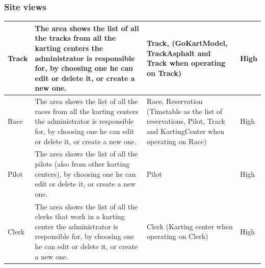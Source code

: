 \documentclass{beamer}
\begin{document}
\begin{frame}
    \frametitle{Site views}
    \begin{table}
        \centering
        \tiny
        \setlength{\tabcolsep}{1pt}
        \begin{tabular}{|m{2cm}|m{4cm}|m{3cm}|m{1cm}|}
        \hline
        Track & The area shows the list of all the tracks from all the karting centers
        the administrator is responsible for, by choosing one he can edit or delete it, or create a new one.
         & Track, (GoKartModel, TrackAsphalt and
        Track when operating on Track) & High \\
        \hline
        Race & The area shows the list of all the races 
        from all the karting centers the administrator is responsible for, by choosing one he can edit or delete it, or create a new one.
         & Race, Reservation (Timetable as the list of reservations, 
        Pilot, Track and KartingCenter when operating on Race) & High \\
        \hline
        Pilot & The area shows the list of all the pilots (also from other karting centers),
        by choosing one he can edit or delete it, or create a new one.
         & Pilot & High \\
        \hline
        Clerk & The area shows the list of all the clerks that work in a 
        karting center the administrator is responsible for, by choosing one he can edit or delete it, or create a new one.
         & Clerk (Karting center when operating on Clerk) & High \\
        \hline
        \end{tabular}
    \end{table}
\end{frame}
\end{document}
